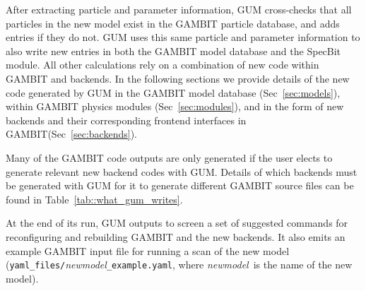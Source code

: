 \documentclass[pdftex,twocolumn,epjc3_preprint,runningheads]{svjour3}
\renewcommand{\_}{\discretionary{\underscore}{}{\underscore}}
\newcommand\term[1]{{\lstset{style=terminal}\lstinline!#1!\lstset{style=cpp}}}
\newcommand{\metavarf}[1]{\textit{\color{darkgreen}\footnotesize\textrm{#1}}}
\newcommand{\metavar}{\metavarf}
\newcommand{\gambit}{\textsf{GAMBIT}\xspace}
\newcommand{\specbit}{\textsf{SpecBit}\xspace}
\newcommand{\GB}{\gambit}
\newcommand{\gum}{\textsf{GUM}\xspace}
\newcommand{\nm}{\metavar{new\_model}}
\begin{document}
After extracting particle and parameter information, \gum cross-checks that all particles in the new model exist in the \GB particle database, and adds entries if they do not. \gum uses this same particle and parameter information to also write new entries in both the \GB model database and the \specbit module.  All other calculations rely on a combination of new code within \GB and backends.  In the following sections we provide details of the new code generated by \gum in the \GB model database (Sec\ \ref{sec:models}), within \GB physics modules (Sec\ \ref{sec:modules}), and in the form of new backends and their corresponding frontend interfaces in \GB (Sec\ \ref{sec:backends}).

Many of the \GB code outputs are only generated if the user elects to generate relevant new backend codes with \gum.  Details of which backends must be generated with \gum for it to generate different \GB source files can be found in Table~\ref{tab::what_gum_writes}.

At the end of its run, \gum outputs to screen a set of suggested commands for reconfiguring and rebuilding \gambit and the new backends.  It also emits an example \GB input file for running a scan of the new model (\term{yaml_files/}\nm\term{_example.yaml}, where \nm\ is the name of the new model).
\end{document}
